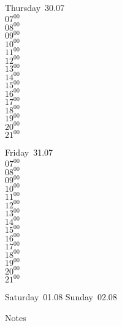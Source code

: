 \documentclass[11pt,a4paper]{book}\usepackage[]{graphicx}\usepackage[]{color}
\begin{document}
\clearpage
\begin{headerbox}
\end{headerbox}
\begin{weekdaybox}
  Thursday~30.07\\
  { 
  \vfill
  $07^{00}$\\
$08^{00}$\\
$09^{00}$\\
$10^{00}$\\
$11^{00}$\\
$12^{00}$\\
$13^{00}$\\
$14^{00}$\\
$15^{00}$\\
$16^{00}$\\
$17^{00}$\\
$18^{00}$\\
$19^{00}$\\
$20^{00}$\\
$21^{00}$\\
  }
\end{weekdaybox} 
\begin{weekdaybox}
  Friday~31.07\\
  { 
  \vfill
  $07^{00}$\\
$08^{00}$\\
$09^{00}$\\
$10^{00}$\\
$11^{00}$\\
$12^{00}$\\
$13^{00}$\\
$14^{00}$\\
$15^{00}$\\
$16^{00}$\\
$17^{00}$\\
$18^{00}$\\
$19^{00}$\\
$20^{00}$\\
$21^{00}$\\
  }
\end{weekdaybox}
\begin{weekendbox}
  Saturday~01.08
  \tcblower
  Sunday~02.08
\end{weekendbox} %
\begin{notebox}
  Notes
\end{notebox}
\clearpage
\end{document}
